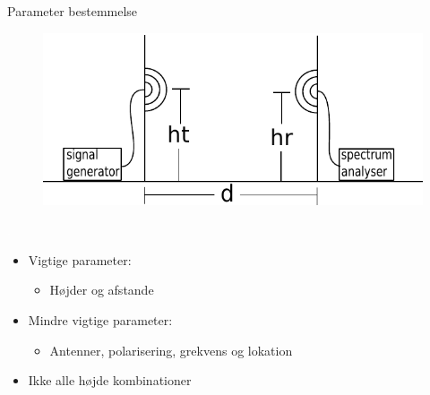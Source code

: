 \begin{frame}{Parameter bestemmelse}
\begin{figure}[!htbp]
	\centering
	\includegraphics[width = 0.8\columnwidth]{figures/setup.pdf}
\end{figure}
\begin{minipage}{0.15\textwidth}
 \textcolor{white}{.}  
\end{minipage}%
\begin{minipage}{0.8\textwidth}
\begin{itemize}
\item Vigtige parameter:
\begin{itemize}
\item Højder og afstande
\end{itemize}
\item Mindre vigtige parameter:
\begin{itemize}
\item Antenner, polarisering, grekvens og lokation
\end{itemize}
\item Ikke alle højde kombinationer
\end{itemize}
\end{minipage}
\end{frame}





